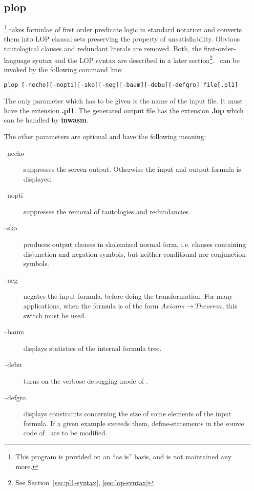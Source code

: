 %

\subsection{plop}
\label{sec:plop}

\Plop\footnote{This program is provided on an ``as is'' basis, and is
not maintained any more.}
takes formulae of first order predicate logic in standard notation
and converts them into LOP clausal sets preserving the property
of unsatisfiability. Obvious tautological clauses and redundant
literals are removed. 
Both, the first-order-language syntax and the LOP syntax are described in
a later section\footnote{See Section~\ref{sec:pl1-syntax},
\ref{sec:lop-syntax}}. \Plop\ can be invoked by the following
command line: 
\begin{verbatim}
plop [-necho][-nopti][-sko][-neg][-baum][-debu][-defgro] file[.pl1]
\end{verbatim}
The only parameter which has to be given is the name of the input file.
It must have the extension {\bf .pl1}. The generated output file
has the extension {\bf .lop} which can be handled by {\bf inwasm}.

The other parameters are optional and have the following meaning:
\begin{description}
\item[--necho]
suppresses the screen output. 
Otherwise the input and output formula is displayed.
\item[--nopti]
suppresses the removal of tautologies and redundancies. 
\item[--sko]
produces output clauses in skolemized
normal form, i.e. clauses containing disjunction
and negation symbols, but neither conditional nor conjunction
symbols.
\item[--neg]
negates the input formula, before doing the transformation.
For many applications, when the formula is of the form
$Axioms \rightarrow Theorem$, this switch must be used.
\item[--baum]
displays statistics of the internal formula tree.
\item[--debu]
turns on the verbose debugging mode of \plop.
\item[--defgro]
displays constraints concerning the size of some elements
of the input formula. If a given example exceeds them, define-statements
in the source code of \plop\ are to be modified.
\end{description}
